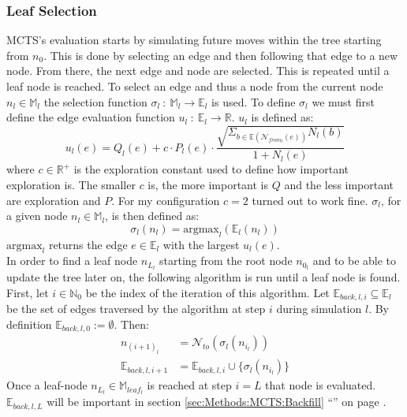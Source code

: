 \documentclass[12pt]{article}
\newcommand{\sectionref}[1]{section \ref{#1} ``\nameref{#1}'' on page \pageref{#1}}
\begin{document}
\subsubsection{Leaf Selection} \label{sec:Methods:MCTS:Leaf_selection}
MCTS's evaluation starts by simulating future moves within the tree starting from \(n_0\). This is done by selecting an edge and then following that edge to a new node. From there, the next edge and node are selected. This is repeated until a leaf node is reached. To select an edge and thus a node from the current node \(n_l\in \mathbb{M}_l\) the selection function \(\sigma_l~:~\mathbb M_l \to\mathbb E_l\) is used. To define \(\sigma_l\) we must first define the edge evaluation function \(u_l~:~\mathbb{E}_{l}\to\mathbb{R}\). \(u_l\) is defined as:
\begin{equation}
u_l(e) = Q_l(e) + c \cdot P_l(e)\cdot\frac{\sqrt{\Sigma_{b\in\mathbb{E}(\mathcal{N}_{from_l}(e))}N_l(b)}}{1+N_l(e)}
\end{equation}
where \(c\in \mathbb{R}^+\) is the exploration constant used to define how important exploration is. The smaller \(c\) is, the more important is \(Q\) and the less important are exploration and \(P\). For my configuration \(c = 2\) turned out to work fine. \(\sigma_l\), for a given node \(n_l\in\mathbb{M}_l\), is then defined as:
\begin{equation}\label{eq:sigma}
\sigma_l(n_l) = \text{argmax}_l(\mathbb{E}_l(n_l))
\end{equation}
\(\text{argmax}_l\) returns the edge \(e \in\mathbb E_l\) with the largest \(u_l(e)\).\\
In order to find a leaf node \(n_{L_l}\) starting from the root node \(n_{0_l}\) and to be able to update the tree later on, the following algorithm is run until a leaf node is found. First, let \(i \in\mathbb N_0\) be the index of the iteration of this algorithm. Let \(\mathbb E_{back,l,i} \subseteq \mathbb E_l\) be the set of edges traversed by the algorithm at step \(i\) during simulation \(l\). By definition \(\mathbb E_{back,l,0} := \emptyset\). Then:
\begin{align}
n_{(i+1)_l} &= \mathcal N_{to}(\sigma_l (n_{i_l}))\\
\mathbb E_{back,l,i+1} &= \mathbb E_{back,l,i} \cup \{\sigma_l (n_{i_l})\}
\end{align}
Once a leaf-node \(n_{L_l}\in\mathbb{M}_{leaf_l}\) is reached at step \(i = L\) that node is evaluated. \(\mathbb E_{back,l,L}\) will be important in \sectionref{sec:Methods:MCTS:Backfill}. 
\end{document}
